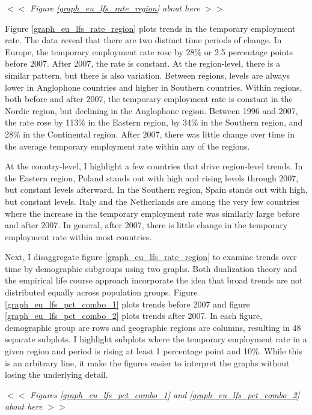 \documentclass[12pt]{article}
\begin{document}
\begin{center}
$<<$ \emph{Figure \ref{graph_eu_lfs_rate_region} about here} $>>$
\end{center}

Figure \ref{graph_eu_lfs_rate_region} plots trends in the temporary employment rate.  The data reveal that there are two distinct time periods of change. In Europe, the temporary employment rate rose by 28\% or 2.5 percentage points before 2007.  After 2007, the rate is constant.  At the region-level, there is a similar pattern, but there is also variation.  Between regions, levels are always lower in Anglophone countries and higher in Southern countries.  Within regions, both before and after 2007, the temporary employment rate is constant in the Nordic region, but declining in the Anglophone region.  Between 1996 and 2007, the rate rose by 113\% in the Eastern region, by 34\% in the Southern region, and 28\% in the Continental region.  After 2007, there was little change over time in the average temporary employment rate within any of the regions.   

At the country-level, I highlight a few countries that drive region-level trends.  In the Eastern region, Poland stands out with high and rising levels through 2007, but constant levels afterward.  In the Southern region, Spain stands out with high, but constant levels.  Italy and the Netherlands are among the very few countries where the increase in the temporary employment rate was similarly large before and after 2007.  In general, after 2007, there is little change in the temporary employment rate within most countries.  

Next, I disaggregate figure \ref{graph_eu_lfs_rate_region} to examine trends over time by demographic subgroups using two graphs.  Both dualization theory and the empirical life course approach incorporate the idea that broad trends are not distributed equally across population groups.  Figure \ref{graph_eu_lfs_pct_combo_1} plots trends before 2007 and figure \ref{graph_eu_lfs_pct_combo_2} plots trends after 2007.  In each figure, demographic group are rows and geographic regions are columns, resulting in 48 separate subplots.  I highlight subplots where the temporary employment rate in a given region and period is rising at least 1 percentage point and 10\%.  While this is an arbitrary line, it make the figures easier to interpret the graphs without losing the underlying detail.

\begin{center}
$<<$ \emph{Figures \ref{graph_eu_lfs_pct_combo_1} and \ref{graph_eu_lfs_pct_combo_2} about here} $>>$
\end{center}
\end{document}
